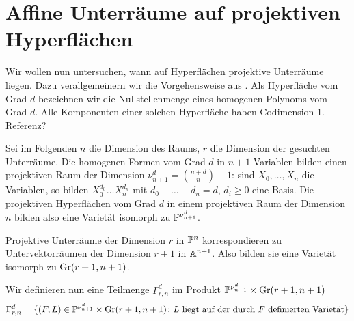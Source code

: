 \section{Affine Unterräume auf projektiven Hyperflächen} \label{sec:linesproj}
Wir wollen nun untersuchen, wann auf Hyperflächen projektive Unterräume liegen. Dazu verallgemeinern wir die Vorgehensweise aus \cite[S.~78ff]{Shafarevich}. Als Hyperfläche vom Grad $d$ bezeichnen wir die Nullstellenmenge eines homogenen Polynoms vom Grad $d$. Alle Komponenten einer solchen Hyperfläche haben Codimension 1. \note Referenz?

Sei im Folgenden $n$ die Dimension des Raums, $r$ die Dimension der gesuchten Unterräume. Die homogenen Formen vom Grad $d$ in $n+1$ Variablen bilden einen projektiven Raum der Dimension $\nu_{n+1}^d = \binom{n+d}{n} - 1$: sind $X_0, \dots, X_n$ die Variablen, so bilden $X_0^{d_0} \dots X_n^{d_n}$ mit $d_0 + \dots + d_n = d$, $d_i \geq 0$ eine Basis. Die projektiven Hyperflächen vom Grad $d$ in einem projektiven Raum der Dimension $n$ bilden also eine Varietät isomorph zu $\mathbb P^{\nu_{n+1}^d}$.

Projektive Unterräume der Dimension $r$ in $\mathbb P^{n}$ korrespondieren zu Untervektorräumen der Dimension $r+1$ in $\mathbb A^{n+1}$. Also bilden sie eine Varietät isomorph zu $\grass r+1/{n+1}$.

Wir definieren nun eine Teilmenge $\Gamma_{r,n}^d$ im Produkt $\proj{\nu_{n+1}^d} \times \grass r+1/{n+1}$
\begin{equation}
\Gamma_{r,n}^d = \{(F,L) \in \mathbb P^{\nu_{n+1}^d} \times \grass r+1/{n+1} \colon \text{$L$ liegt auf der durch $F$ definierten Varietät} \}
\end{equation}

